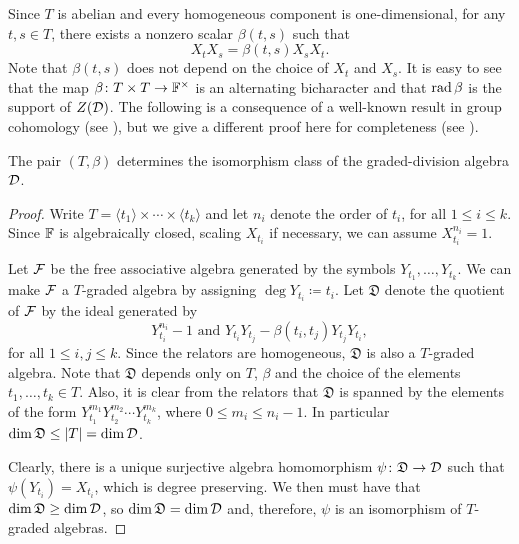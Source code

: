 Since $T$ is abelian and every homogeneous component is one-dimensional, for any $t, s \in T$, there exists a nonzero scalar $\beta(t,s)$ such that 
\[\label{eq:beta}
    X_t X_s = \beta(t, s) X_s X_t.
\]
Note that $\beta(t,s)$ does not depend on the choice of $X_t$ and $X_s$. 
It is easy to see that the map $\beta\colon T\times T \to \mathbb{F}^\times$ is an alternating bicharacter and that $\operatorname{rad} \beta$ is the support of $Z(\mathcal{D})$. 
The following is a consequence of a well-known result in group cohomology (see \cite[Section 2.2]{EK_d4}), but we give a different proof here for completeness (see \cite[Section 4]{BZ18}). 

\begin{prop}\label{prop:T-beta-determines-iso}
    The pair $(T, \beta)$ determines the isomorphism class of the graded-division algebra $\mathcal{D}$.
\end{prop}

\begin{proof}
    Write $T = \langle t_1 \rangle \times \cdots \times \langle t_k \rangle$ and let $n_i$ denote the order of $t_i$, for all $1\leq i \leq k$. 
    Since $\mathbb{F}$ is algebraically closed, scaling $X_{t_i}$ if necessary, we can assume  $X_{t_i}^{n_i} = 1$. 
    
    Let $\mathcal F$ be the free associative algebra generated by the symbols $Y_{t_1}, \ldots, Y_{t_k}$. 
    We can make $\mathcal F$ a $T$-graded algebra by assigning $\deg Y_{t_i} \coloneqq t_i$. 
    Let $\mathfrak{D}$ denote the quotient of $\mathcal F$ by the ideal generated by 
    \[\label{eq:relations-D}
        Y_{t_i}^{n_i} - 1 \text{ and }Y_{t_i}Y_{t_j} - \beta(t_i, t_j) Y_{t_j}Y_{t_i},
    \] 
    for all $1\leq i,j \leq k$. 
    Since the relators are homogeneous, $\mathfrak{D}$ is also a $T$-graded algebra. 
    Note that $\mathfrak{D}$ depends only on $T$, $\beta$ and the choice of the elements $t_1, \ldots, t_k \in T$.  
    Also, it is clear from the relators that $\mathfrak{D}$ is spanned by the elements of the form $Y_{t_1}^{m_1}Y_{t_2}^{m_2} \cdots Y_{t_k}^{m_k}$, where $0\leq m_i \leq n_i - 1$. 
    In particular $\dim \mathfrak{D} \leq |T| = \dim \mathcal{D}$.
    
    Clearly, there is a unique surjective algebra homomorphism $\psi\colon \mathfrak{D} \to \mathcal{D}$ such that $\psi(Y_{t_i}) = X_{t_i}$, which is degree preserving. 
    We then must have that $\dim \mathfrak{D} \geq \dim \mathcal{D}$, so $\dim \mathfrak{D} = \dim \mathcal{D}$ and, therefore, $\psi$ is an isomorphism of $T$-graded algebras. 
\end{proof}

